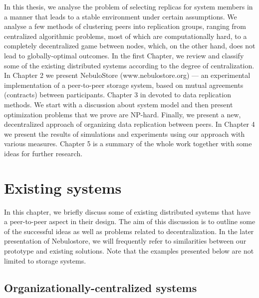 \documentclass{pracamgren}
\begin{document}
In this thesis, we analyse the problem of selecting replicas for system members in a manner that leads to a stable environment under certain assumptions.
We analyse a few methods of clustering peers into replication groups, ranging from centralized algorithmic problems, most of which are computationally hard, to a completely decentralized game between nodes, which, on the other hand, does not lead to globally-optimal outcomes.
In the first Chapter, we review and classify some of the existing distributed systems according to the degree of centralization. In Chapter 2 we present NebuloStore (www.nebulostore.org) --- an experimental implementation of a peer-to-peer storage system, based on mutual agreements (contracts) between participants. Chapter 3 in devoted to data replication methods. We start with a discussion about system model and then present optimization problems that we prove are NP-hard. Finally, we present a new, decentralized approach of organizing data replication between peers. In Chapter 4 we present the results of simulations and experiments using our approach with various measures. Chapter 5 is a summary of the whole work together with some ideas for further research.\\

%
%
%
%
\chapter{Existing systems}\label{r:existing}

In this chapter, we briefly discuss some of existing distributed systems that have a peer-to-peer aspect in their design. The aim of this discussion is to outline some of the successful ideas as well as problems related to decentralization. In the later presentation of Nebulostore, we will frequently refer to similarities between our prototype and existing solutions. Note that the examples presented below are not limited to storage systems.\\

\section{Organizationally-centralized systems}
\end{document}
